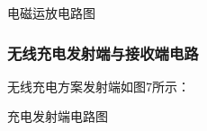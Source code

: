 \documentclass{article}%
\begin{document}
\begin{multicols}{2}
		\begin{center}
			\caption{电磁运放电路图}		
		\end{center}
		
		\subsubsection{无线充电发射端与接收端电路}
		
		无线充电方案发射端如图7所示：
		\begin{center}
			\caption{充电发射端电路图}		
		\end{center}
		

\end{multicols}
\end{document}
